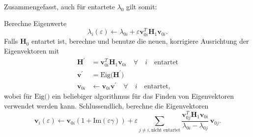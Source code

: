 
Zusammengefasst, auch für entartete $\lambda_0$ gilt somit:
\begin{aufloesung}
Berechne Eigenwerte
\begin{equation*}
    \lambda_i(\varepsilon)
    \gets
    \lambda_{0i} + \varepsilon \bm v_{0i}^T \bm H_1 \bm v_{0i}.
\end{equation*}
Falls $\bm H_0$ entartet ist, berechne und benutze die neuen, korrigiere Ausrichtung der Eigenvektoren mit
\begin{align*}
    \bm H^\prime & = \bm v_{0i}^T \bm H_1 \bm v_{0i} \quad \forall \quad i \quad \text{entartet} \\
    \bm v^\prime & = \mathrm{Eig} \Big( \bm H^\prime \Big) \\
    \bm v_{0i} & \gets \bm v_{0i} \bm v^\prime  \quad \forall \quad i \quad \text{entartet},
\end{align*}
wobei für $\mathrm{Eig} \Big( \Big)$ ein beliebiger algorithmus für das Finden von Eigenvektoren verwendet werden kann.
Schlussendlich, berechne die Eigenvektoren
\begin{equation*}
    \bm v_i(\varepsilon)
    \gets
    \bm v_{0i} ( 1 + \mathrm{Im}(\varepsilon \gamma) ) + \varepsilon \sum_{j \neq i, \text{nicht entartet}}
    \frac{\bm v_{0j}^T \bm H_1 \bm v_{0i}}{\lambda_{0i} - \lambda_{0j}}
    \, \bm v_{0j}.
\end{equation*}
\end{aufloesung}
